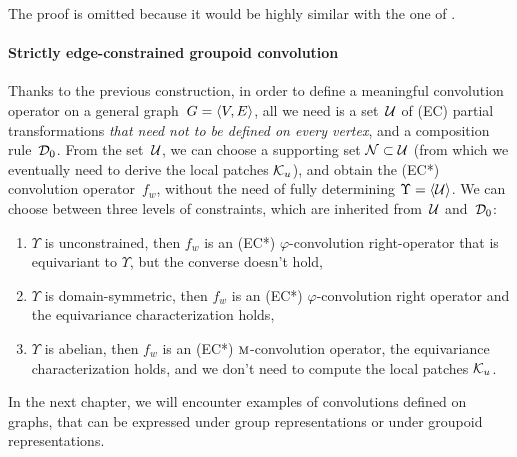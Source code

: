 The proof is omitted because it would be highly similar with the one of .

\paragraph{Strictly edge-constrained groupoid convolution}

Thanks to the previous construction, in order to define a meaningful convolution operator on a general graph~$G = \langle V, E \rangle$, all we need is a set~$\mathcal{U}$ of (EC) partial transformations \emph{that need not to be defined on every vertex}, and a composition rule~$\mathcal{D}_0$. From the set~$\mathcal{U}$, we can choose a supporting set $\mathcal{N} \subset \mathcal{U}$ (from which we eventually need to derive the local patches $\mathcal{K}_u$), and obtain the (EC*) convolution operator~$f_w$, without the need of fully determining $\Upsilon = \langle \mathcal{U} \rangle$. We can choose between three levels of constraints, which are inherited from~$\mathcal{U}$ and~$\mathcal{D}_0$:
\begin{enumerate}
  \item $\Upsilon$ is unconstrained, then $f_w$ is an (EC*) $\varphi$-convolution right-operator that is equivariant to $\Upsilon$, but the converse doesn't hold,
  \item $\Upsilon$ is domain-symmetric, then $f_w$ is an (EC*) $\varphi$-convolution right operator and the equivariance characterization holds,
  \item $\Upsilon$ is abelian, then $f_w$ is an (EC*) $\operatorname{\textsc{m}}$-convolution operator, the equivariance characterization holds, and we don't need to compute the local patches $\mathcal{K}_u$.
\end{enumerate}

In the next chapter, we will encounter examples of convolutions defined on graphs, that can be expressed under group representations or under groupoid representations.
